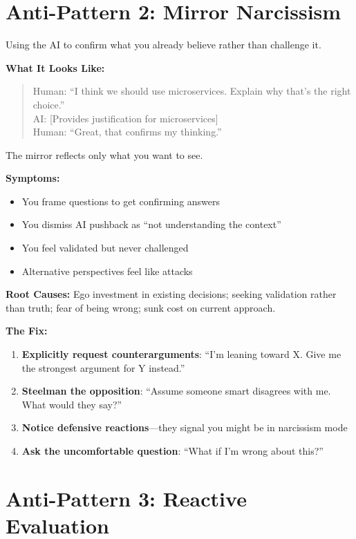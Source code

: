 \section{Anti-Pattern 2: Mirror Narcissism}

Using the AI to confirm what you already believe rather than challenge it.

\textbf{What It Looks Like:}

\begin{quote}
Human: ``I think we should use microservices. Explain why that's the right choice.''\\
AI: [Provides justification for microservices]\\
Human: ``Great, that confirms my thinking.''
\end{quote}

The mirror reflects only what you want to see.

\textbf{Symptoms:}
\begin{itemize}
    \item You frame questions to get confirming answers
    \item You dismiss AI pushback as ``not understanding the context''
    \item You feel validated but never challenged
    \item Alternative perspectives feel like attacks
\end{itemize}

\textbf{Root Causes:} Ego investment in existing decisions; seeking validation rather than truth; fear of being wrong; sunk cost on current approach.

\textbf{The Fix:}
\begin{enumerate}
    \item \textbf{Explicitly request counterarguments}: ``I'm leaning toward X. Give me the strongest argument for Y instead.''
    \item \textbf{Steelman the opposition}: ``Assume someone smart disagrees with me. What would they say?''
    \item \textbf{Notice defensive reactions}---they signal you might be in narcissism mode
    \item \textbf{Ask the uncomfortable question}: ``What if I'm wrong about this?''
\end{enumerate}

\section{Anti-Pattern 3: Reactive Evaluation}

